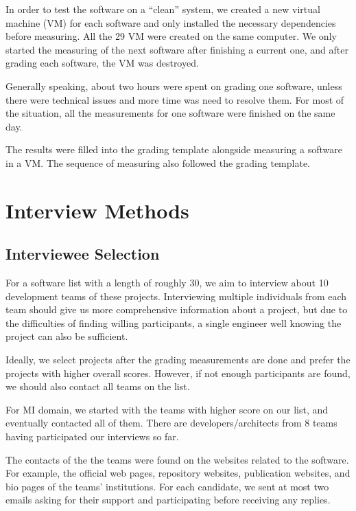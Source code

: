 In order to test the software on a ``clean'' system, we created a new virtual machine (VM) for each software and only installed the necessary dependencies before measuring. All the 29 VM were created on the same computer. We only started the measuring of the next software after finishing a current one, and after grading each software, the VM was destroyed.

Generally speaking, about two hours were spent on grading one software, unless there were technical issues and more time was need to resolve them. For most of the situation, all the measurements for one software were finished on the same day.

The results were filled into the grading template alongside measuring a software in a VM. The sequence of measuring also followed the grading template.

\section{Interview Methods}
\label{sec_interview_methods}

\subsection{Interviewee Selection}

For a software list with a length of roughly 30, we aim to interview about 10 development teams of these projects. Interviewing multiple individuals from each team should give us more comprehensive information about a project, but due to the difficulties of finding willing participants, a single engineer well knowing the project can also be sufficient.

Ideally, we select projects after the grading measurements are done and prefer the projects with higher overall scores. However, if not enough participants are found, we should also contact all teams on the list.

For MI domain, we started with the teams with higher score on our list, and eventually contacted all of them. There are developers/architects from 8 teams having participated our interviews so far.

The contacts of the the teams were found on the websites related to the software. For example, the official web pages, repository websites, publication websites, and bio pages of the teams' institutions. For each candidate, we sent at most two emails asking for their support and participating before receiving any replies.

